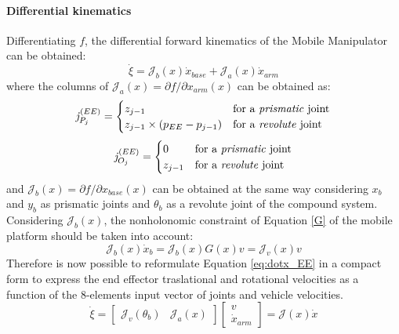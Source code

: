 \paragraph{Differential kinematics}Differentiating $f$, the differential forward kinematics of the Mobile Manipulator can be obtained:
\begin{equation}\label{eq:dotx_EE}
	\dot{\xi}=\mathcal{J}_b(x)\dot{x}_{base}+\mathcal{J}_a(x)\dot{x}_{arm}
\end{equation}
where the columns of $\mathcal{J}_a(x)={\partial f}/{\partial x_{arm}}(x)$ can be obtained as:
\begin{equation}
\mathit{j}_{P_j}^{(EE)}=
	\begin{cases}
	z_{j-1} & \text{for a \textit{prismatic} joint} \\
	z_{j-1}\times \left(p_{EE}-p_{j-1}\right) & \text{for a \textit{revolute} joint}	
	\end{cases}                                             
\end{equation}
\begin{equation}
	\mathit{j}_{O_j}^{(EE)}= 
	\begin{cases}
	0 & \text{for a \textit{prismatic} joint} \\
	z_{j-1} & \text{for a \textit{revolute} joint}	
	\end{cases} 
\end{equation}
and $\mathcal{J}_b(x)={\partial f}/{\partial x_{base}}(x)$ can be obtained at the same way considering $x_b$ and $y_b$ as prismatic joints and $\theta_b$ as a revolute joint of the compound system.\\
Considering $\mathcal{J}_b(x)$, the nonholonomic constraint of Equation \eqref{G} of the mobile platform should be taken into account:
\begin{equation}
	\mathcal{J}_b(x)\dot{x}_b=\mathcal{J}_b(x)G(x)v=\mathcal{J}_v(x)v
\end{equation}
Therefore is now possible to reformulate Equation \eqref{eq:dotx_EE} in a compact form to express the end effector traslational and rotational velocities as a function of the 8-elements input vector of joints and vehicle velocities.
\begin{equation}
\dot{\xi}=\left[\begin{matrix}
\mathcal{J}_v(\theta_b) & \mathcal{J}_a(x)
\end{matrix}\right]\left[\begin{matrix}v\\\dot{x}_{arm} \end{matrix}\right] = \mathcal{J}(x)\dot{x}
\end{equation}

